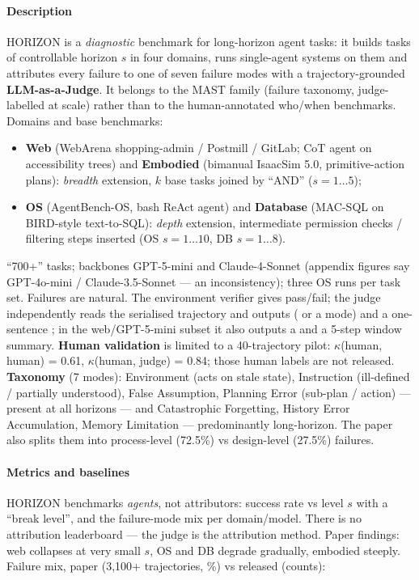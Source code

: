 \paragraph{Description} HORIZON is a \emph{diagnostic} benchmark for long-horizon agent tasks: it builds tasks of controllable horizon $s$ in four domains, runs single-agent systems on them and attributes every failure to one of seven failure modes with a trajectory-grounded \textbf{LLM-as-a-Judge}. It belongs to the MAST family (failure taxonomy, judge-labelled at scale) rather than to the human-annotated who/when benchmarks. Domains and base benchmarks:
\begin{itemize}
\item \textbf{Web} (WebArena shopping-admin / Postmill / GitLab; CoT agent on accessibility trees) and \textbf{Embodied} (bimanual IsaacSim 5.0, primitive-action plans): \emph{breadth} extension, $k$ base tasks joined by ``AND'' ($s{=}1\ldots5$);
\item \textbf{OS} (AgentBench-OS, bash ReAct agent) and \textbf{Database} (MAC-SQL on BIRD-style text-to-SQL): \emph{depth} extension, intermediate permission checks / filtering steps inserted (OS $s{=}1\ldots10$, DB $s{=}1\ldots8$).
\end{itemize}
``700+'' tasks; backbones GPT-5-mini and Claude-4-Sonnet (appendix figures say GPT-4o-mini / Claude-3.5-Sonnet --- an inconsistency); three OS runs per task set. Failures are natural. The environment verifier gives pass/fail; the judge independently reads the serialised trajectory and outputs  ( or a mode) and a one-sentence ; in the web/GPT-5-mini subset it also outputs a  and a 5-step window summary. \textbf{Human validation} is limited to a 40-trajectory pilot: $\kappa$(human, human) = 0.61, $\kappa$(human, judge) = 0.84; those human labels are not released. \textbf{Taxonomy} (7 modes): Environment (acts on stale state), Instruction (ill-defined / partially understood), False Assumption, Planning Error (sub-plan / action) --- present at all horizons --- and Catastrophic Forgetting, History Error Accumulation, Memory Limitation --- predominantly long-horizon. The paper also splits them into process-level (72.5\%) vs design-level (27.5\%) failures.

\paragraph{Metrics and baselines} HORIZON benchmarks \emph{agents}, not attributors: success rate vs level $s$ with a ``break level'', and the failure-mode mix per domain/model. There is no attribution leaderboard --- the judge is the attribution method. Paper findings: web collapses at very small $s$, OS and DB degrade gradually, embodied steeply. Failure mix, paper (3,100+ trajectories, \%) vs released  (counts):

